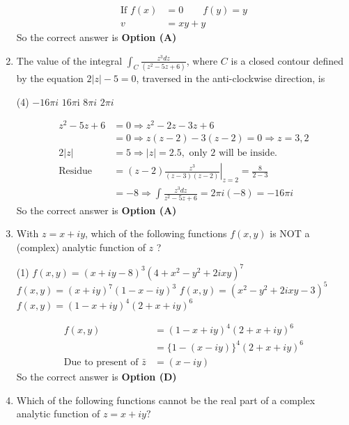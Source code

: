 \begin{enumerate}[label=\color{ocre}\textbf{\arabic*.}]
\begin{answer}
\begin{align*}
		\text{If }f(x)&=0\quad \quad
		f(y)=y\\
		v&=x y+y
		\end{align*}
		So the correct answer is \textbf{Option (A)}
	\end{answer}
	\item The value of the integral $\int_{C} \frac{z^{3} d z}{\left(z^{2}-5 z+6\right)}$, where $C$ is a closed contour defined by the equation $2|z|-5=0$, traversed in the anti-clockwise direction, is
	{}
	\begin{tasks}(4)
		\task[\textbf{A.}] $-16 \pi i$
		\task[\textbf{B.}] $16 \pi \mathrm{i}$
		\task[\textbf{C.}] $8 \pi i$
		\task[\textbf{D.}] $2 \pi i$
	\end{tasks}
	\begin{answer}
		\begin{align*}
		z^{2}-5 z+6&=0 \Rightarrow z^{2}-2 z-3 z+6\\&=0 \Rightarrow z(z-2)-3(z-2)=0 \Rightarrow z=3,2\\
		2|z|&=5 \Rightarrow|z|=2.5,\text{ only 2 will be inside.}\\
		\text{Residue }&=\left.(z-2) \frac{z^{3}}{(z-3)(z-2)}\right|_{z=2}=\frac{8}{2-3}\\&=-8 \Rightarrow \int \frac{z^{3} d z}{z^{2}-5 z+6}=2 \pi i(-8)=-16 \pi i
		\end{align*}
		So the correct answer is \textbf{Option (A)}
	\end{answer}
	\item  With $z=x+i y$, which of the following functions $f(x, y)$ is NOT a (complex) analytic function of $z$ ?
	{}
	\begin{tasks}(1)
		\task[\textbf{A.}] $f(x, y)=(x+i y-8)^{3}\left(4+x^{2}-y^{2}+2 i x y\right)^{7}$
		\task[\textbf{B.}] $f(x, y)=(x+i y)^{7}(1-x-i y)^{3}$
		\task[\textbf{C.}] $f(x, y)=\left(x^{2}-y^{2}+2 i x y-3\right)^{5}$
		\task[\textbf{D.}] $f(x, y)=(1-x+i y)^{4}(2+x+i y)^{6}$
	\end{tasks}
	\begin{answer}
		\begin{align*}
		f(x, y)&=(1-x+i y)^{4}(2+x+i y)^{6}\\&=\{1-(x-i y)\}^{4}(2+x+i y)^{6}\\
		\text{Due to present of }\bar{z}&=(x-i y)
		\end{align*}
		So the correct answer is \textbf{Option (D)}
	\end{answer}
	\item  Which of the following functions cannot be the real part of a complex analytic function of $z=x+i y ?$

\end{enumerate}
